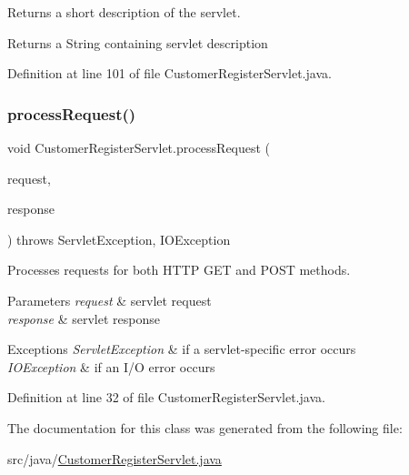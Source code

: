 Returns a short description of the servlet.

\begin{DoxyReturn}{Returns}
a String containing servlet description 
\end{DoxyReturn}


Definition at line 101 of file Customer\+Register\+Servlet.\+java.

\mbox{\label{class_customer_register_servlet_a107ac767839a6faf83b5530c737e94e3}} 
\subsubsection{\texorpdfstring{processRequest()}{processRequest()}}
{\footnotesize\ttfamily void Customer\+Register\+Servlet.\+process\+Request (\begin{DoxyParamCaption}\item[{Http\+Servlet\+Request}]{request,  }\item[{Http\+Servlet\+Response}]{response }\end{DoxyParamCaption}) throws Servlet\+Exception, I\+O\+Exception\hspace{0.3cm}{\ttfamily [protected]}}

Processes requests for both H\+T\+TP {\ttfamily G\+ET} and {\ttfamily P\+O\+ST} methods.


\begin{DoxyParams}{Parameters}
{\em request} & servlet request \\
\hline
{\em response} & servlet response \\
\hline
\end{DoxyParams}

\begin{DoxyExceptions}{Exceptions}
{\em Servlet\+Exception} & if a servlet-\/specific error occurs \\
\hline
{\em I\+O\+Exception} & if an I/O error occurs \\
\hline
\end{DoxyExceptions}


Definition at line 32 of file Customer\+Register\+Servlet.\+java.



The documentation for this class was generated from the following file\+:\begin{DoxyCompactItemize}
\item 
src/java/\mbox{\hyperlink{_customer_register_servlet_8java}{Customer\+Register\+Servlet.\+java}}\end{DoxyCompactItemize}
